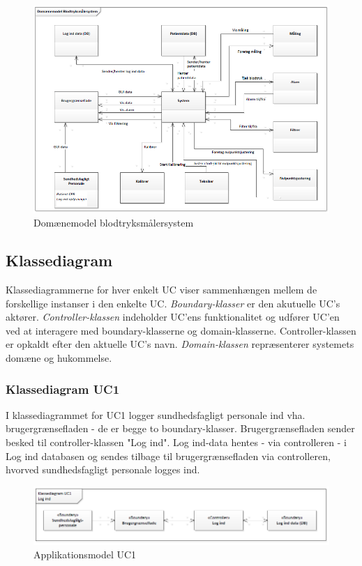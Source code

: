 \begin{figure}[H]
\centering
\includegraphics[scale=0.70]{dom.PNG}
\caption{Domænemodel blodtryksmålersystem}
\end{figure}

\newpage

\subsection{Klassediagram}
Klassediagrammerne for hver enkelt UC viser sammenhængen mellem de forskellige instanser i den enkelte UC. \newline 
\textit{Boundary-klasser} er den akutuelle UC's aktører. \newline 
\textit{Controller-klassen} indeholder UC'ens funktionalitet og udfører UC'en ved at interagere med boundary-klasserne og domain-klasserne. Controller-klassen er opkaldt efter den aktuelle UC's navn. \newline
\textit{Domain-klassen} repræsenterer systemets domæne og hukommelse. 
\subsubsection{Klassediagram UC1}
I klassediagrammet for UC1 logger sundhedsfagligt personale ind vha. brugergrænsefladen - de er begge to boundary-klasser. Brugergrænsefladen sender besked til controller-klassen "Log ind". Log ind-data hentes - via controlleren - i Log ind databasen og sendes tilbage til brugergrænsefladen via controlleren, hvorved sundhedsfagligt personale logges ind. 
\begin{figure}[H]
\centering
\includegraphics[scale=0.70]{app1.PNG}
\caption{Applikationsmodel UC1}
\end{figure}

